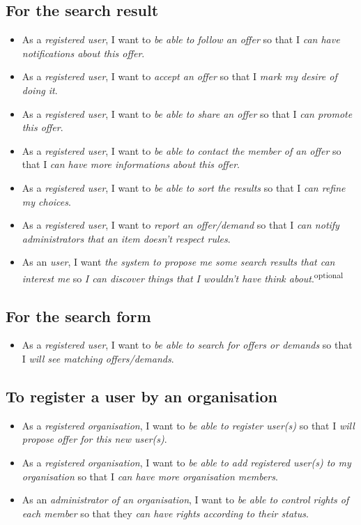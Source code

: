\subsection{For the search result}
\begin{itemize}
    \item As a \textit{registered user}, I want to \textit{be able to follow an offer} so that I \textit{can have notifications about this offer}.
    \item As a \textit{registered user}, I want to \textit{accept an offer} so that I \textit{mark my desire of doing it}.
    \item As a \textit{registered user}, I want to \textit{be able to share an offer} so that I \textit{can promote this offer}.
    \item As a \textit{registered user}, I want to \textit{be able to contact the member of an offer} so that I \textit{can have more informations about this offer}.
    \item As a \textit{registered user}, I want to \textit{be able to sort the results} so that I \textit{can refine my choices}.
    \item As a \textit{registered user}, I want to \textit{report an offer/demand} so that I \textit{can notify administrators that an item doesn't respect rules}.
    \item As an \textit{user}, I want \textit{the system to propose me some search results that can interest me} so \textit {I can discover things that I wouldn't have think about}.\textsuperscript{optional}
\end{itemize}

\subsection{For the search form}
\begin{itemize}
    \item As a \textit{registered user}, I want to \textit{be able to search for offers or demands} so that I \textit{will see matching offers/demands}.
\end{itemize}

\subsection{To register a user by an organisation}
\begin{itemize}
    \item As a \textit{registered organisation}, I want to \textit{be able to register user(s)} so that I \textit{will propose offer for this new user(s)}.
    \item As a \textit{registered organisation}, I want to \textit{be able to add registered user(s) to my organisation} so that I \textit{can have more organisation members}.
    \item As an \textit{administrator of an organisation}, I want to \textit{be able to control rights of each member} so that they \textit{can have rights according to their status}.
\end{itemize}

